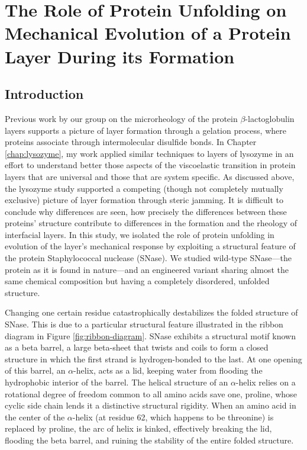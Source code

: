 \chapter{\label{chap:snase}The Role of Protein Unfolding on Mechanical Evolution of a Protein Layer During its Formation}

\section{Introduction}

Previous work by our group on the microrheology of the protein $\beta$-lactoglobulin layers\cite{Lee2010} supports a picture of layer formation through a gelation process, where proteins associate through intermolecular disulfide bonds. In Chapter \ref{chap:lysozyme}, my work applied similar techniques to layers of lysozyme in an effort to understand better those aspects of the viscoelastic transition in protein layers that are universal and those that are system specific. As discussed above, the lysozyme study supported a competing (though not completely mutually exclusive) picture of layer formation through steric jamming. It is difficult to conclude why differences are seen, how precisely the differences between these proteins' structure contribute to differences in the formation and the rheology of interfacial layers. In this study, we isolated the role of protein unfolding in evolution of the layer's mechanical response by exploiting a structural feature of the protein Staphylococcal nuclease (SNase). We studied wild-type SNase---the protein as it is found in nature---and an engineered variant sharing almost the same chemical composition but having a completely disordered, unfolded structure.

Changing one certain residue catastrophically destabilizes the folded structure of SNase. This is due to a particular structural feature illustrated in the ribbon diagram in Figure \ref{fig:ribbon-diagram}. SNase exhibits a structural motif known as a beta barrel, a large beta-sheet that twists and coils to form a closed structure in which the first strand is hydrogen-bonded to the last. At one opening of this barrel, an $\alpha$-helix, acts as a lid, keeping water from flooding the hydrophobic interior of the barrel. The helical structure of an $\alpha$-helix relies on a rotational degree of freedom common to all amino acids save one, proline, whose cyclic side chain lends it a distinctive structural rigidity. When an amino acid in the center of the $\alpha$-helix (at residue 62, which happens to be threonine) is replaced by proline, the arc of helix is kinked, effectively breaking the lid, flooding the beta barrel, and ruining the stability of the entire folded structure.

